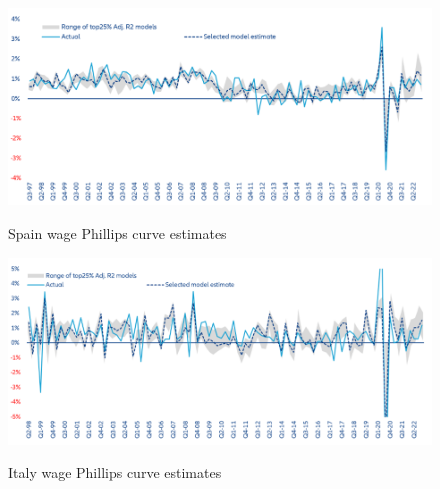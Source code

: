 \begin{figure}[H]
    \centering
    \caption{Spain wage Phillips curve estimates}
    \includegraphics[width=.95\textwidth]{Core/2.Labour/img/Spain25.png}
    \label{figure:sp25}
\end{figure}

\begin{figure}[H]
    \centering
    \caption{Italy wage Phillips curve estimates}
    \includegraphics[width=.95\textwidth]{Core/2.Labour/img/Italy25.png}
    \label{figure:it25}
\end{figure}

